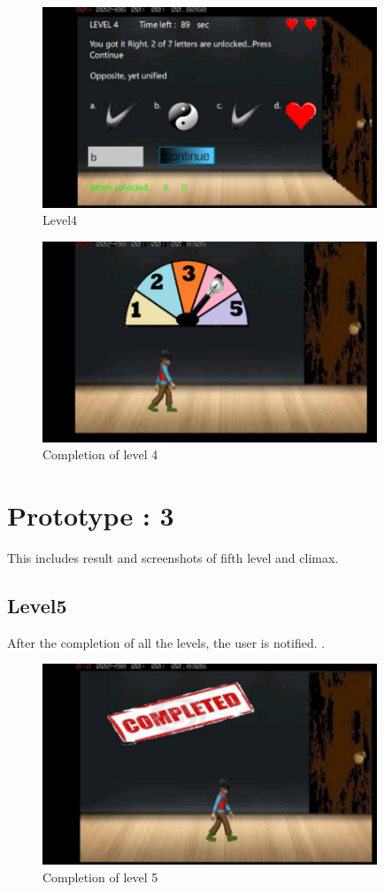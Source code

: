 \begin{figure}[htbp]
	\centering
	\includegraphics[width=10cm,height=6cm]{11.jpg}
	\caption{Level4}
\end{figure}
\begin{figure}[htbp]
	\centering
	\includegraphics[width=10cm,height=6cm]{12.jpg}
	\caption{Completion of level 4}
\end{figure}


\section{Prototype : 3}
\hspace{1cm} This includes result and screenshots of fifth level and climax.

\subsection{Level5}
\hspace{1cm}After the completion of all the levels, the user is notified. \cite{DBLP:journals/ivc/KadyrovP03}.\\
\begin{figure}[htbp]
	\centering
	\includegraphics[width=10cm,height=6cm]{13.jpg}
	\caption{Completion of level 5}
\end{figure}
